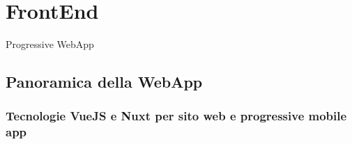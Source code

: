 \documentclass[xcolor=svgnames, aspectratio=169]{beamer}
\begin{document}

\section{FrontEnd}

\begin{frame}{\secname}
    \tableofcontents[sections={\thesection}, subsubsectionstyle=show, sectionstyle=hide]
\end{frame}


\begin{frame}{Progressive WebApp}
    \vspace*{-56pt}
    \begin{figure}[H]
        \centering
        \noindent{}
    \end{figure}
\end{frame}

\subsection{Panoramica della WebApp}


\subsubsection{Tecnologie VueJS e Nuxt per sito web e progressive mobile app}

\end{document}
